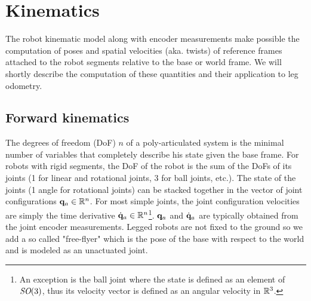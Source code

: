 \chapter{Kinematics}
\minitoc

The robot kinematic model along with encoder measurements make possible the computation of poses and spatial velocities \cite{featherstone2014rigid} (aka. twists) 
of reference frames attached to the robot segments relative to the base or world frame. We will shortly describe the computation of these quantities and their 
application to leg odometry.


\section{Forward kinematics}
\label{sec:forward_kinematics}
The degrees of freedom (DoF) $n$ of a poly-articulated system is the minimal number of variables that completely describe his state given the base frame. 
For robots with rigid segments, the DoF of the robot is the sum of the DoFs of its joints (1 for linear and rotational joints, 3 for
ball joints, etc.).
The state of the joints (1 angle for rotational joints) can be stacked together in the vector of joint configurations 
${\bf q}_a \in \mathbb{R}^n$. For most simple joints, the joint configuration velocities are simply the time derivative $\dot{{\bf q}}_a \in \mathbb{R}^n$\footnote{An exception is the ball joint where the 
state is defined as an element of $\textit{SO}(3)$, thus its velocity vector is defined as an angular velocity in $\mathbb{R}^3$.}. ${\bf q}_a$ and $\dot{{\bf q}}_a$ are typically obtained from
the joint encoder measurements.
Legged robots are not fixed to the ground so we add a so called "free-flyer" which is the pose of the base with respect to the world and is modeled as an unactuated joint. 

